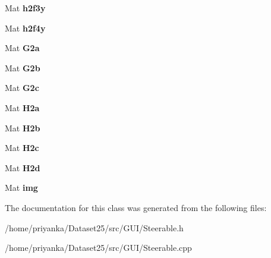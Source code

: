 \begin{DoxyCompactItemize}
\item 
\hypertarget{classSteerable_a57414b4e4ea2de94c70400638ae942d3}{\-Mat {\bfseries h2f3y}}\label{classSteerable_a57414b4e4ea2de94c70400638ae942d3}

\item 
\hypertarget{classSteerable_a4a5562955e8704f6c8a34fd77ac3b897}{\-Mat {\bfseries h2f4y}}\label{classSteerable_a4a5562955e8704f6c8a34fd77ac3b897}

\item 
\hypertarget{classSteerable_ac76f88ecda047b147053020d26101c49}{\-Mat {\bfseries \-G2a}}\label{classSteerable_ac76f88ecda047b147053020d26101c49}

\item 
\hypertarget{classSteerable_a3df81b01948827b5c3007e1a86d1bec3}{\-Mat {\bfseries \-G2b}}\label{classSteerable_a3df81b01948827b5c3007e1a86d1bec3}

\item 
\hypertarget{classSteerable_a59433c1cb21d6db8fadf6af0e2dd1b08}{\-Mat {\bfseries \-G2c}}\label{classSteerable_a59433c1cb21d6db8fadf6af0e2dd1b08}

\item 
\hypertarget{classSteerable_a62124ff47698f4f351365c1df16fa2f2}{\-Mat {\bfseries \-H2a}}\label{classSteerable_a62124ff47698f4f351365c1df16fa2f2}

\item 
\hypertarget{classSteerable_ad5844b0eb491793abd6e55887ac3ebbe}{\-Mat {\bfseries \-H2b}}\label{classSteerable_ad5844b0eb491793abd6e55887ac3ebbe}

\item 
\hypertarget{classSteerable_a756d4d2510d57834317c4e9f6fa13896}{\-Mat {\bfseries \-H2c}}\label{classSteerable_a756d4d2510d57834317c4e9f6fa13896}

\item 
\hypertarget{classSteerable_ab7328f76d0b3e29fa742452de127e738}{\-Mat {\bfseries \-H2d}}\label{classSteerable_ab7328f76d0b3e29fa742452de127e738}

\item 
\hypertarget{classSteerable_a244271436163a6bde687600a28c16c10}{\-Mat {\bfseries img}}\label{classSteerable_a244271436163a6bde687600a28c16c10}

\end{DoxyCompactItemize}


\-The documentation for this class was generated from the following files\-:\begin{DoxyCompactItemize}
\item 
/home/priyanka/\-Dataset25/src/\-G\-U\-I/\-Steerable.\-h\item 
/home/priyanka/\-Dataset25/src/\-G\-U\-I/\-Steerable.\-cpp\end{DoxyCompactItemize}
